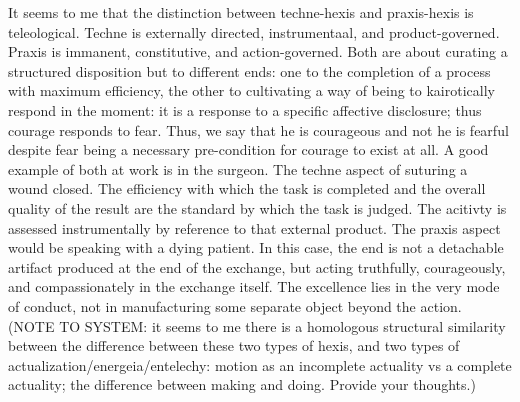 \documentclass{article}
\begin{document}
\begin{list}
    \item It seems to me that the distinction between techne-hexis and praxis-hexis is teleological. Techne is externally directed, instrumentaal, and product-governed. Praxis is immanent, constitutive, and action-governed. Both are about curating a structured disposition but to different ends: one to the completion of a process with maximum efficiency, the other to cultivating a way of being to kairotically respond in the moment: it is a response to a specific affective disclosure; thus courage responds to fear. Thus, we say that he is courageous and not he is fearful despite fear being a necessary pre-condition for courage to exist at all. A good example of both at work is in the surgeon. The techne aspect of suturing a wound closed. The efficiency with which the task is completed and the overall quality of the result are the standard by which the task is judged. The acitivty is assessed instrumentally by reference to that external product. The praxis aspect would be speaking with a dying patient. In this case, the end is not a detachable artifact produced at the end of the exchange, but acting truthfully, courageously, and compassionately in the exchange itself. The excellence lies in the very mode of conduct, not in manufacturing some separate object beyond the action. (NOTE TO SYSTEM: it seems to me there is a homologous structural similarity between the difference between these two types of hexis, and two types of actualization/energeia/entelechy: motion as an incomplete actuality vs a complete actuality; the difference between making and doing. Provide your thoughts.)


\end{list}
\end{document}
